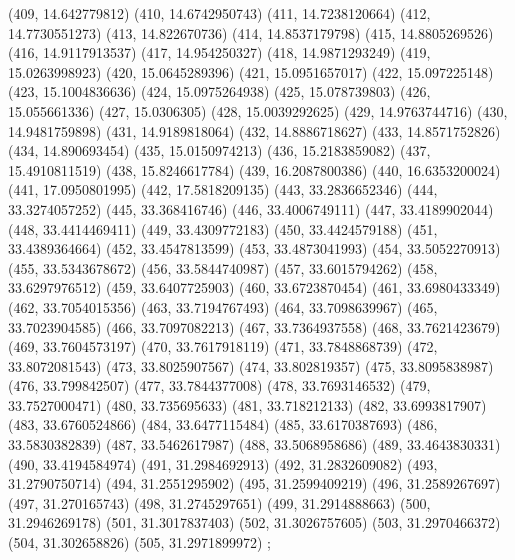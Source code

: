 {					(409, 14.642779812)
					(410, 14.6742950743)
					(411, 14.7238120664)
					(412, 14.7730551273)
					(413, 14.822670736)
					(414, 14.8537179798)
					(415, 14.8805269526)
					(416, 14.9117913537)
					(417, 14.954250327)
					(418, 14.9871293249)
					(419, 15.0263998923)
					(420, 15.0645289396)
					(421, 15.0951657017)
					(422, 15.097225148)
					(423, 15.1004836636)
					(424, 15.0975264938)
					(425, 15.078739803)
					(426, 15.055661336)
					(427, 15.0306305)
					(428, 15.0039292625)
					(429, 14.9763744716)
					(430, 14.9481759898)
					(431, 14.9189818064)
					(432, 14.8886718627)
					(433, 14.8571752826)
					(434, 14.890693454)
					(435, 15.0150974213)
					(436, 15.2183859082)
					(437, 15.4910811519)
					(438, 15.8246617784)
					(439, 16.2087800386)
					(440, 16.6353200024)
					(441, 17.0950801995)
					(442, 17.5818209135)
					(443, 33.2836652346)
					(444, 33.3274057252)
					(445, 33.368416746)
					(446, 33.4006749111)
					(447, 33.4189902044)
					(448, 33.4414469411)
					(449, 33.4309772183)
					(450, 33.4424579188)
					(451, 33.4389364664)
					(452, 33.4547813599)
					(453, 33.4873041993)
					(454, 33.5052270913)
					(455, 33.5343678672)
					(456, 33.5844740987)
					(457, 33.6015794262)
					(458, 33.6297976512)
					(459, 33.6407725903)
					(460, 33.6723870454)
					(461, 33.6980433349)
					(462, 33.7054015356)
					(463, 33.7194767493)
					(464, 33.7098639967)
					(465, 33.7023904585)
					(466, 33.7097082213)
					(467, 33.7364937558)
					(468, 33.7621423679)
					(469, 33.7604573197)
					(470, 33.7617918119)
					(471, 33.7848868739)
					(472, 33.8072081543)
					(473, 33.8025907567)
					(474, 33.802819357)
					(475, 33.8095838987)
					(476, 33.799842507)
					(477, 33.7844377008)
					(478, 33.7693146532)
					(479, 33.7527000471)
					(480, 33.735695633)
					(481, 33.718212133)
					(482, 33.6993817907)
					(483, 33.6760524866)
					(484, 33.6477115484)
					(485, 33.6170387693)
					(486, 33.5830382839)
					(487, 33.5462617987)
					(488, 33.5068958686)
					(489, 33.4643830331)
					(490, 33.4194584974)
					(491, 31.2984692913)
					(492, 31.2832609082)
					(493, 31.2790750714)
					(494, 31.2551295902)
					(495, 31.2599409219)
					(496, 31.2589267697)
					(497, 31.270165743)
					(498, 31.2745297651)
					(499, 31.2914888663)
					(500, 31.2946269178)
					(501, 31.3017837403)
					(502, 31.3026757605)
					(503, 31.2970466372)
					(504, 31.302658826)
					(505, 31.2971899972)
				};
